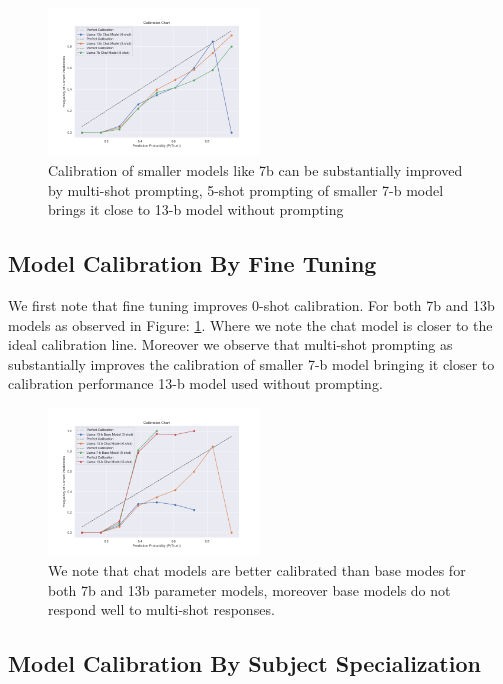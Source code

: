 \documentclass[11pt]{article}
\begin{document}
\begin{figure}
  \centering
  \includegraphics[width=0.5\textwidth]{figures/0-shot-vs-5-shot-7b-vs-13b-chat.png}
  \caption{Calibration of smaller models like 7b can be substantially improved by multi-shot prompting, 5-shot prompting of smaller 7-b model brings it close to 13-b model without prompting}
\end{figure}

\subsection{Model Calibration By Fine Tuning}  

We first note that fine tuning improves 0-shot calibration. For both 7b and 13b models as observed in 
Figure: \ref{fig:chat-vs-hf}. Where we note the chat model is closer to the ideal calibration line. Moreover we observe that 
multi-shot prompting as substantially improves the calibration of smaller 7-b model bringing it closer to calibration performance 13-b model used without prompting.

\begin{figure}
  \includegraphics[width=0.5\textwidth]{figures/0-shot-13-b-chat-vs-13-b-hf.png}
  \caption{We note that chat models are better calibrated than base modes for both 7b and 13b parameter models, moreover base models do not respond well to multi-shot responses.}
  \label{fig:chat-vs-hf}
\end{figure}

\subsection{Model Calibration By Subject Specialization}  
\end{document}
